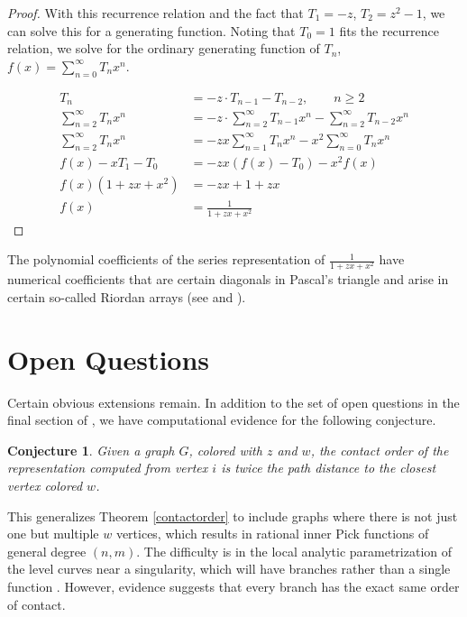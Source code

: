 \documentclass[12pt]{amsart}
\newtheorem{conjecture}[theorem]{Conjecture}
\theoremstyle{remark}
\numberwithin{equation}{section}
\begin{document}
\begin{proof}
        With this recurrence relation and the fact that $T_1 = -z$, $T_2 = z^2 - 1$, we can solve this for a generating function. Noting that $T_0 = 1$ fits the recurrence relation, we solve for the ordinary generating function of $T_n$, $f(x) = \sum\limits_{n=0}^\infty T_n x^n$.

        \begin{align*}
            T_n &= -z \cdot T_{n-1} - T_{n-2}, \qquad  n\ge 2\\
            \sum\limits_{n=2}^\infty T_n x^n &= -z \cdot \sum\limits_{n=2}^\infty T_{n-1}x^n - \sum\limits_{n=2}^\infty T_{n-2}x^n \\
            \sum\limits_{n=2}^\infty T_n x^n &= -zx \sum\limits_{n=1}^\infty T_n x^n - x^2 \sum\limits_{n=0}^\infty T_n x^n \\
            f(x) - xT_1 - T_0 &= -zx(f(x) - T_0) - x^2f(x) \\
            f(x)(1 + zx + x^2) &= -zx + 1 + zx \\
            f(x) &= \frac{1}{1 + zx + x^2}
        \end{align*}
    \end{proof}

The polynomial coefficients of the series representation of $\frac{1}{1 + zx + x^2}$ have numerical coefficients that are certain diagonals in Pascal's triangle and arise in certain so-called Riordan arrays (see \cite[A109466]{oeis} and  \cite{barry}). 

\section{Open Questions}

Certain obvious extensions remain. In addition to the set of open questions in the final section of \cite{bickelhong}, we have computational evidence for the following conjecture.
\begin{conjecture}
    Given a graph $G$, colored with $z$ and $w$, the contact order of the representation computed from vertex $i$ is twice the path distance to the closest vertex colored $w$.
\end{conjecture}
    
This generalizes Theorem \ref{contactorder} to include graphs where there is not just one but multiple $w$ vertices, which results in rational inner Pick functions of general degree $(n,m)$. The difficulty is in the local analytic parametrization of the level curves near a singularity, which will have branches rather than a single function \cite{bps2}. However, evidence suggests that every branch has the exact same order of contact. 
\end{document}
